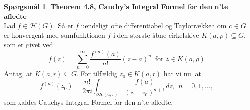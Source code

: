\documentclass[10pt,a4paper]{article}
\theoremstyle{definition}
\newtheorem{Prob}{Spørgsmål}
\begin{document}
\newpage
\begin{Prob}{\textbf{Theorem 4.8, Cauchy's Integral Formel for den n'te afledte}} \\

Lad $f \in \mathcal{H}(G)$. Så er $f$ uendeligt ofte differentiabel og Taylorrækken om $a \in G$ er konvergent med sumfunktionen $f$ i den største åbne cirkelskive $K(a, \rho) \subseteq G$, som er givet ved
\begin{equation}
f(z)= \sum\limits_{n=0}^\infty \frac{f^{(n)}(a)}{n!} (z-a)^n \ \text{ for } z \in K(a,\rho)
\end{equation}
Antag, at $\overline{K(a,r)} \subseteq G$. For tilfældig $z_0 \in K(a,r)$ har vi nu, at
\begin{equation}
f^{(n)}(z_0) = \frac{n!}{2 \pi i} \int_{\partial K(a,r)} \frac{f(a)}{(z-z_0)^{n+1}} dz, \ \ n = 0, 1, ...,
\end{equation}
som kaldes Cauchys Integral Formel for den n'te afledte.
\end{Prob}
\end{document}
